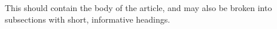 This should contain the body of the article, and may also be broken into subsections with short, informative headings.